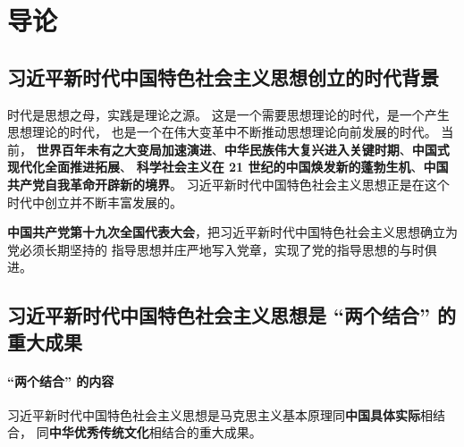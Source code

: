 \documentclass[UTF8,10pt]{ctexbook} %
\begin{document}




\chapter*{导论}
\thispagestyle{empty}
\setcounter{chapter}{0}
\section{习近平新时代中国特色社会主义思想创立的时代背景}


时代是思想之母，实践是理论之源。
这是一个需要思想理论的时代，是一个产生思想理论的时代，
也是一个在伟大变革中不断推动思想理论向前发展的时代。
当前，
\textbf{世界百年未有之大变局加速演进}、\textbf{中华民族伟大复兴进入关键时期}、\textbf{中国式现代化全面推进拓展}、
\textbf{科学社会主义在 21 世纪的中国焕发新的蓬勃生机}、\textbf{中国共产党自我革命开辟新的境界}。
习近平新时代中国特色社会主义思想正是在这个时代中创立并不断丰富发展的。


\textbf{中国共产党第十九次全国代表大会}，把习近平新时代中国特色社会主义思想确立为党必须长期坚持的
指导思想并庄严地写入党章，实现了党的指导思想的与时俱进。



\section{习近平新时代中国特色社会主义思想是 “两个结合” 的重大成果}

\setcounter{subsubsection}{0}
\subsubsection{“两个结合” 的内容}

习近平新时代中国特色社会主义思想是马克思主义基本原理同\textbf{中国具体实际}相结合，
同\textbf{中华优秀传统文化}相结合的重大成果。
\end{document}
